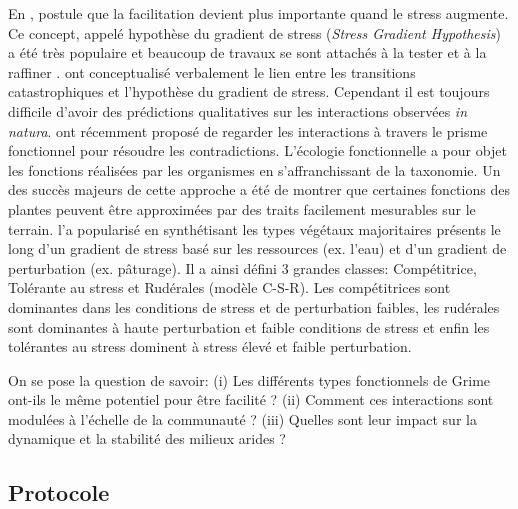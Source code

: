 \documentclass[12pt]{article} %
\begin{document}
En \citeyear{Bertness1994}, \citeauthor{Bertness1994} postule que la facilitation devient plus importante quand le stress augmente. Ce concept, appelé hypothèse du gradient de stress (\textit{Stress Gradient Hypothesis}) a été très populaire et beaucoup de travaux se sont attachés à la tester et à la raffiner \citep{ Anthelme2007,Maestre2009,He2013}. \citet{Verwijmeren2013} ont conceptualisé verbalement le lien entre les transitions catastrophiques et l'hypothèse du gradient de stress. Cependant il est toujours difficile d'avoir des prédictions qualitatives sur les interactions observées \textit{in natura}. \citet{Butterfield2013} ont récemment proposé de regarder les interactions à travers le prisme fonctionnel pour résoudre les contradictions. L'écologie fonctionnelle a pour objet les fonctions réalisées par les organismes en s'affranchissant de la taxonomie. Un des succès majeurs de cette approche a été de montrer que certaines fonctions des plantes peuvent être approximées par des traits facilement mesurables sur le terrain. \citet{Grime1977a} l'a popularisé en synthétisant les types végétaux majoritaires présents le long d'un gradient de stress basé sur les ressources (ex. l'eau) et d'un gradient de perturbation (ex. pâturage). Il a ainsi défini 3 grandes classes: Compétitrice, Tolérante au stress et Rudérales (modèle C-S-R). Les compétitrices sont dominantes dans les conditions de stress et de perturbation faibles, les rudérales sont dominantes à haute perturbation et faible conditions de stress et enfin les tolérantes au stress dominent à stress élevé et faible perturbation.

On se pose la question de savoir: (i) Les différents types fonctionnels de Grime ont-ils le même potentiel pour être facilité ? (ii) Comment ces interactions sont modulées à l'échelle de la communauté ? (iii) Quelles sont leur impact sur la dynamique et la stabilité des milieux arides ?

\subsection{Protocole}
\end{document}
